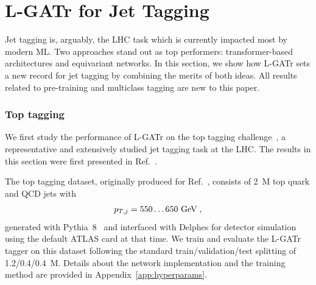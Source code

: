 \documentclass[submission, Phys]{SciPost}
\begin{document}
\section{L-GATr for Jet Tagging}
\label{sec:tagging}

Jet tagging is, arguably, the LHC task which is currently impacted most by modern ML. Two approaches stand out as top performers: transformer-based architectures and equivariant networks. In this section, we show how L-GATr sets a new record for jet tagging by combining the merits of both ideas. All results related to pre-training and multiclass tagging are new to this paper.

\subsubsection*{Top tagging}


We first study the performance of L-GATr on the top tagging challenge~\cite{Kasieczka:2019dbj}, a representative and extensively studied jet tagging task at the LHC. The results in this section were first presented in Ref.~\cite{Spinner:2024hjm}.

The top tagging dataset, originally produced for Ref.~\cite{Heimel:2018mkt}, consists of 2~M top quark and QCD jets with 
%
\begin{align}
  p_{T,j} = 550 \ldots 650~\text{GeV} \; ,
\end{align}
%
generated with Pythia~8~\cite{Sjostrand:2014zea} and interfaced with Delphes for detector simulation~\cite{deFavereau:2013fsa} using the default ATLAS card at that time.
We train and evaluate the L-GATr tagger on this dataset following the standard train/validation/test splitting of 1.2/0.4/0.4~M. Details about the network implementation and the training method are provided in Appendix~\ref{app:hyperparams}. 
\end{document}
